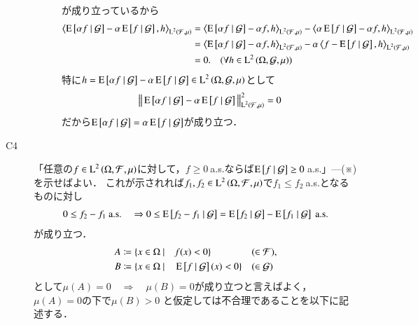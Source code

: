 \begin{prf}
\begin{description}
\begin{description}
							が成り立っているから
							\begin{align}
								\inprod<\cexp{\alpha f}{\mathcal{G}} - \alpha \cexp{f}{\mathcal{G}}, h>_{\Lp{2}{\mathcal{F},\mu}} 
								&= \inprod<\cexp{\alpha f}{\mathcal{G}} - \alpha f, h>_{\Lp{2}{\mathcal{F},\mu}} - \inprod<\alpha \cexp{f}{\mathcal{G}} - \alpha f, h>_{\Lp{2}{\mathcal{F},\mu}} \\
								&= \inprod<\cexp{\alpha f}{\mathcal{G}} - \alpha f, h>_{\Lp{2}{\mathcal{F},\mu}} - \alpha \inprod<f - \cexp{f}{\mathcal{G}}, h>_{\Lp{2}{\mathcal{F},\mu}} \\
								&= 0. \quad (\forall h \in \Lp{2}{\Omega, \mathcal{G},\mu})
							\end{align}
							特に$h = \operatorname{E} \left[ \alpha f \ \middle|\ \mathcal{G} \right] - \alpha \operatorname{E} \left[ f \ \middle|\ \mathcal{G} \right] \in \operatorname{L}^{2} \left(\Omega, \mathcal{G},\mu\right)$として
							\begin{align}
								\left\|\, \operatorname{E} \left[ \alpha f \ \middle|\ \mathcal{G} \right] - \alpha \operatorname{E} \left[ f \ \middle|\ \mathcal{G} \right]\, \right\|_{\operatorname{L}^{2} \left(\mathcal{F},\mu\right)}^2 = 0
							\end{align}
							だから$\operatorname{E} \left[ \alpha f \ \middle|\ \mathcal{G} \right] = \alpha \operatorname{E} \left[ f \ \middle|\ \mathcal{G} \right]$が成り立つ．
				\end{description}
				
				
			\item[C4] 「任意の$f \in \operatorname{L}^{2} \left(\Omega, \mathcal{F},\mu\right)$に対して，$f \geq 0\ $a.s.ならば$\cexp{f}{\mathcal{G}} \geq 0\ $a.s.」---(※)を示せばよい．
				これが示されれば$f_1,f_2 \in \operatorname{L}^{2} \left(\Omega, \mathcal{F},\mu\right)$で$f_1 \leq f_2\ $a.s.となるものに対し
				\begin{align}
					0 \leq f_2 - f_1\ \mathrm{a.s.} \quad \Rightarrow 0 \leq \operatorname{E} \left[ f_2 - f_1 \ \middle|\ \mathcal{G} \right] = \operatorname{E} \left[ f_2 \ \middle|\ \mathcal{G} \right] - \operatorname{E} \left[ f_1 \ \middle|\ \mathcal{G} \right]\ \mathrm{a.s.}
				\end{align}
				が成り立つ．
				\begin{align}
					A &\coloneqq \{x \in \Omega\ |\quad f(x) < 0 \} && (\in \mathcal{F}), \\
					B &\coloneqq \{x \in \Omega\ |\quad \operatorname{E} \left[ f \ \middle|\ \mathcal{G} \right](x) < 0 \} && (\in \mathcal{G})
				\end{align}
				として$\mu(A)=0 \quad \Rightarrow \quad \mu(B)=0$が成り立つと言えばよく，$\mu(A) = 0$の下で$\mu(B) > 0$
				と仮定しては不合理であることを以下に記述する．
				

\end{description}
\end{prf}
